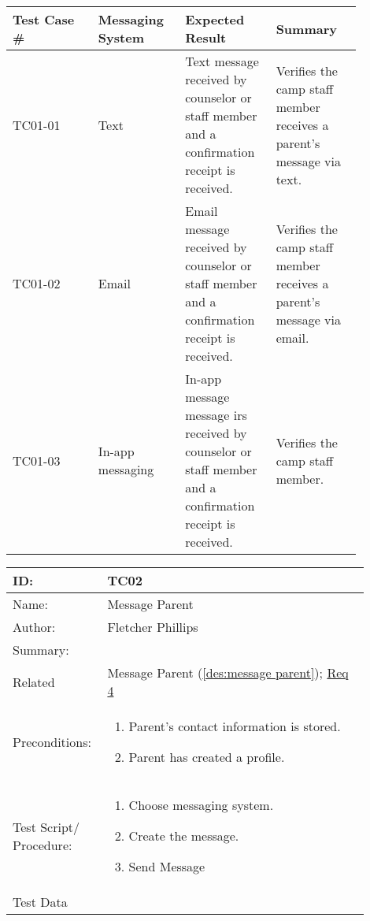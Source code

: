 \documentclass[11pt]{article}
\begin{document}
\begin{center}
\begin{longtable}{|p{0.22\linewidth}|p{0.22\linewidth}|p{0.22\linewidth}|p{0.22\linewidth}|}
	\hline 
	Test Case \# & Messaging System & Expected Result & Summary\\\hline
	TC01-01 & Text & Text message received by counselor or staff member and a confirmation receipt is received. & Verifies the camp staff member receives a parent's message via text.\vspace*{1em}\\\hline
	TC01-02 & Email & Email message received by counselor or staff member and a confirmation receipt is received. & Verifies the camp staff member receives a parent's message via email.\vspace*{1em}\\	\hline
	TC01-03 & In-app messaging & In-app message message irs received by counselor or staff member and a confirmation receipt is received. & Verifies the camp staff member.\vspace*{1em}\\\hline
\end{longtable}
\end{center}
\clearpage


\begin{table}[H]
\begin{center}
\begin{tabular}{p{0.20\linewidth}p{0.70\linewidth}}
	ID: & TC02\\\hline
	Name: & Message Parent \\\hline
	Author: & Fletcher Phillips\\\hline
	Summary: &  \\\hline
	Related \hspace{5em} & Message Parent (\cref{des:message parent}); \hyperlink{Req4}{Req 4} \\\hline
	Preconditions:& \begin{enumerate}[topsep=0pt] 
		\item Parent's contact information is stored.
		\item Parent has created a profile.
	\end{enumerate}\\\hline
	Test Script/ Procedure: & \begin{enumerate}[topsep=0pt]
		\item Choose messaging system.
		\item Create the message.
		\item Send Message
	\end{enumerate}\\\hline
	Test Data &
\end{tabular}
\label{TC02}	
\end{center}
\end{table}
\end{document}
